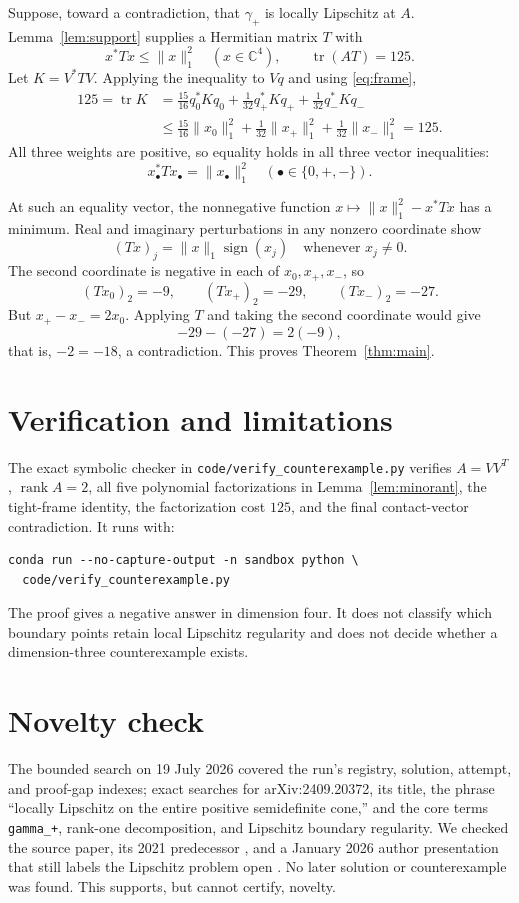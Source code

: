 \documentclass[11pt]{article}
\newcommand{\gp}{\gamma_+}
\newcommand{\C}{\mathbb C}
\newcommand{\tr}{\operatorname{tr}}
\begin{document}
Suppose, toward a contradiction, that $\gp$ is locally Lipschitz at $A$.
Lemma~\ref{lem:support} supplies a Hermitian matrix $T$ with
\[
 x^*Tx\leq\|x\|_1^2\quad(x\in\C^4),
 \qquad \tr(AT)=125.
\]
Let $K=V^*TV$. Applying the inequality to $Vq$ and using
\eqref{eq:frame},
\begin{align*}
125=\tr K
&=\frac{15}{16}q_0^*Kq_0+
  \frac1{32}q_+^*Kq_++
  \frac1{32}q_-^*Kq_-\\
&\leq\frac{15}{16}\|x_0\|_1^2+
  \frac1{32}\|x_+\|_1^2+
  \frac1{32}\|x_-\|_1^2=125.
\end{align*}
All three weights are positive, so equality holds in all three vector
inequalities:
\[
 x_\bullet^*Tx_\bullet=\|x_\bullet\|_1^2
 \quad(\bullet\in\{0,+,-\}).
\]

At such an equality vector, the nonnegative function
$x\mapsto\|x\|_1^2-x^*Tx$ has a minimum. Real and imaginary perturbations in
any nonzero coordinate show
\[
 (Tx)_j=\|x\|_1\operatorname{sign}(x_j)
 \quad\text{whenever }x_j\ne0.
\]
The second coordinate is negative in each of $x_0,x_+,x_-$, so
\[
 (Tx_0)_2=-9,\qquad (Tx_+)_2=-29,\qquad (Tx_-)_2=-27.
\]
But $x_+-x_-=2x_0$. Applying $T$ and taking the second coordinate would give
\[
 -29-(-27)=2(-9),
\]
that is, $-2=-18$, a contradiction. This proves
Theorem~\ref{thm:main}.

\section{Verification and limitations}

The exact symbolic checker in \texttt{code/verify\_counterexample.py}
verifies $A=VV^T$, $\operatorname{rank}A=2$, all five polynomial
factorizations in Lemma~\ref{lem:minorant}, the tight-frame identity, the
factorization cost $125$, and the final contact-vector contradiction. It runs
with:
\begin{verbatim}
conda run --no-capture-output -n sandbox python \
  code/verify_counterexample.py
\end{verbatim}

The proof gives a negative answer in dimension four. It does not classify
which boundary points retain local Lipschitz regularity and does not decide
whether a dimension-three counterexample exists.

\section{Novelty check}

The bounded search on 19 July 2026 covered the run's registry, solution,
attempt, and proof-gap indexes; exact searches for arXiv:2409.20372, its title,
the phrase ``locally Lipschitz on the entire positive semidefinite cone,'' and
the core terms \texttt{gamma\_+}, rank-one decomposition, and Lipschitz
boundary regularity. We checked the source paper, its 2021 predecessor
\cite{BORWZ}, and a January 2026 author presentation that still labels the
Lipschitz problem open \cite{BalanSlides}. No later solution or counterexample
was found. This supports, but cannot certify, novelty.
\end{document}

